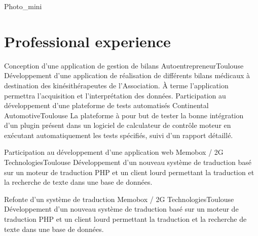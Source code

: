 \documentclass{my_cv_bis}
\begin{document}
 {
}{Photo_mini}

 
 \vspace{-5mm}
\section{Professional experience}
	{Conception d’une application de gestion de bilans}
	{Autoentrepreneur}{Toulouse}
	{
	Développement d'une application de réalisation de différents bilans médicaux à destination des kinésithérapeutes 
	de l'Association. À terme l'application permettra l'acquisition et l'interprétation des données.
	}
	{}
	{Participation au développement d'une plateforme de tests automatisés}
	{Continental Automotive}{Toulouse}
	{
	La plateforme à pour but de tester la bonne intégration d'un plugin présent dans un logiciel de calculateur de contrôle moteur en exécutant
	automatiquement les tests spécifiés, suivi d'un rapport détaillé.
	}
	{}

	{ Participation au développement d'une application web}
	{Memobox / 2G Technologies}{Toulouse}
	{Développement d'un nouveau système de traduction basé sur un moteur de traduction PHP et un client lourd
	permettant la traduction et la recherche de texte dans une base de données.  } {}

	{ Refonte d’un système de traduction }
	{Memobox / 2G Technologies}{Toulouse}
	{Développement d'un nouveau système de traduction basé sur un moteur de traduction PHP et un client lourd
	permettant la traduction et la recherche de texte dans une base de données.  } {}
\end{document}
